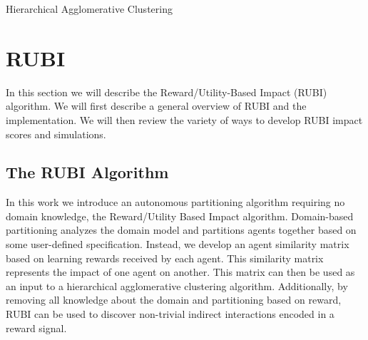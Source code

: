 \documentclass[smallcondensed]{svjour3}
\begin{document}
\begin{algorithm}
  \caption{Hierarchical Agglomerative Clustering}
  \begin{algorithmic}[1]
    \Statex
	   
          \EndFor
        \EndFor
         
          \EndFor
        \EndFor
      \State {}
    \EndFunction
  \end{algorithmic}
\end{algorithm}

\section{RUBI}
In this section we will describe the Reward/Utility-Based Impact (RUBI) algorithm. We will first describe a general overview of RUBI and the implementation. We will then review the variety of ways to develop RUBI impact scores and simulations.

\subsection{The RUBI Algorithm}
In this work we introduce an autonomous partitioning algorithm requiring no domain knowledge, the Reward/Utility Based Impact algorithm. Domain-based partitioning analyzes the domain model and partitions agents together based on some user-defined specification. Instead, we develop an agent similarity matrix based on learning rewards received by each agent. This similarity matrix represents the impact of one agent on another. This matrix can then be used as an input to a hierarchical agglomerative clustering algorithm. Additionally, by removing all knowledge about the domain and partitioning based on reward, RUBI can be used to discover non-trivial indirect interactions encoded in a reward signal.
\end{document}
